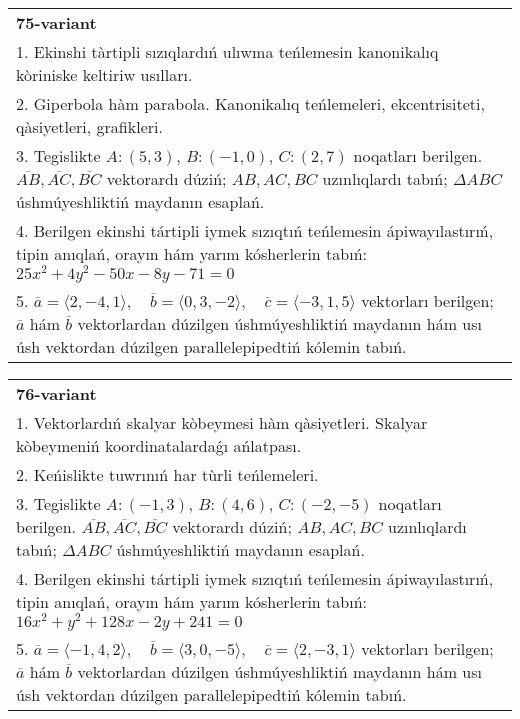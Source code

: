 \documentclass{article}
\begin{document}
\begin{tabular}{m{17cm}}
\textbf{75-variant}\\
1. Ekinshi tàrtipli sızıqlardıń ulıwma teńlemesin kanonikalıq kòriniske keltiriw usılları.\\

2. Giperbola hàm parabola. Kanonikalıq teńlemeleri, ekcentrisiteti, qàsiyetleri, grafikleri.\\

3. Tegislikte $A: (5, 3)$, $B: (-1, 0)$, $C: (2, 7)$ noqatları berilgen. $\overline{AB}, \overline{AC}, \overline{BC}$ vektorardı dúziń; $AB, AC, BC$ uzınlıqlardı tabıń; $\Delta ABC$ úshmúyeshliktiń maydanın esaplań. \\

4. Berilgen ekinshi tártipli iymek sızıqtıń teńlemesin ápiwayılastırıń, tipin anıqlań, orayın hám yarım kósherlerin tabıń: $25x^2+4y^2-50x-8y-71=0$\\

5. \(\overline{a} = \langle 2, -4, 1 \rangle, \quad \overline{b} = \langle 0, 3, -2 \rangle, \quad \overline{c} = \langle -3, 1, 5 \rangle\) vektorları berilgen; \(\overline{a}\) hám \(\overline{b}\) vektorlardan dúzilgen úshmúyeshliktiń maydanın hám usı úsh vektordan dúzilgen parallelepipedtiń kólemin tabıń.
\end{tabular}
\vspace{1cm}


\begin{tabular}{m{17cm}}
\textbf{76-variant}\\
1. Vektorlardıń skalyar kòbeymesi hàm qàsiyetleri. Skalyar kòbeymeniń koordinatalardaǵı ańlatpası.\\

2. Keńislikte tuwrınıń har tùrli teńlemeleri. \\

3. Tegislikte $A: (-1, 3)$, $B: (4, 6)$, $C: (-2, -5)$ noqatları berilgen. $\overline{AB}, \overline{AC}, \overline{BC}$ vektorardı dúziń; $AB, AC, BC$ uzınlıqlardı tabıń; $\Delta ABC$ úshmúyeshliktiń maydanın esaplań. \\

4. Berilgen ekinshi tártipli iymek sızıqtıń teńlemesin ápiwayılastırıń, tipin anıqlań, orayın hám yarım kósherlerin tabıń: $16x^2+y^2+128x-2y+241=0$\\

5. \(\overline{a} = \langle -1, 4, 2 \rangle, \quad \overline{b} = \langle 3, 0, -5 \rangle, \quad \overline{c} = \langle 2, -3, 1 \rangle\) vektorları berilgen; \(\overline{a}\) hám \(\overline{b}\) vektorlardan dúzilgen úshmúyeshliktiń maydanın hám usı úsh vektordan dúzilgen parallelepipedtiń kólemin tabıń.
\end{tabular}
\vspace{1cm}
\end{document}
